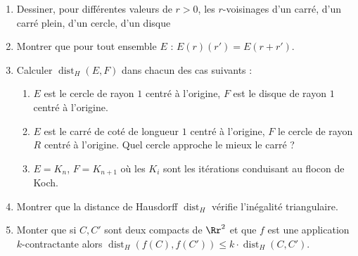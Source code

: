 \documentclass[11pt,class=report,crop=false]{standalone}
\DeclareMathOperator{\dist}{dist}
\begin{document}
\begin{exercicecours}
\sauteligne
\begin{enumerate}
  \item  Dessiner, pour différentes valeurs de $r>0$, les $r$-voisinages d'un carré, d'un carré plein, d'un cercle, d'un disque
  
  \item Montrer que pour tout ensemble $E$ : $E(r)(r')=E(r+r')$.

 \item Calculer $\dist_H (E,F)$ dans chacun des cas suivants :
  \begin{enumerate}
     \item $E$ est le cercle de rayon $1$ centré à l'origine, $F$ est le disque de rayon $1$ centré à l'origine.

     \item $E$ est le carré de coté de longueur $1$ centré à l'origine, $F$ le cercle de rayon $R$ centré à l'origine. Quel cercle approche le mieux le carré ?

     \item $E=K_n$, $F=K_{n+1}$ où les $K_i$ sont les itérations conduisant au flocon de Koch.
  \end{enumerate}
 \item Montrer que la distance de Hausdorff $\dist_H$ vérifie l'inégalité triangulaire.
 \item Monter que si $C, C'$ sont deux compacts de $\Rr^2$ et que $f$ est une application
$k$-contractante alors $\dist_H (f(C),f(C')) \le k \cdot \dist_H (C,C')$.

\end{enumerate}
\end{exercicecours}
\end{document}
